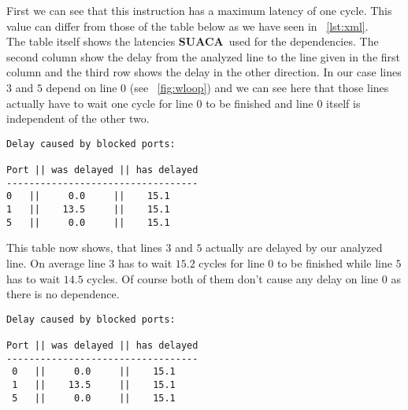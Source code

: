 \documentclass[a4paper,12pt,titlepage, twoside]{report}
\newcommand{\suaca}{\textbf{SUACA}}
\begin{document}
First we can see that this instruction has a maximum latency of one cycle. This value can differ from those of the table below as we have seen in ~\autoref{lst:xml}.\\
The table itself shows the latencies \suaca\ used for the dependencies. The second column show the delay from the analyzed line to the line given in the first column and the third row shows the delay in the other direction. In our case lines $3$ and $5$ depend on line $0$ (see ~\autoref{fig:wloop}) and we can see here that those lines actually have to wait one cycle for line $0$ to be finished and line $0$ itself is independent of the other two.\\

\begin{mdframed}[backgroundcolor=light-gray, roundcorner=10pt,leftmargin=1, rightmargin=1, innerleftmargin=15, innertopmargin=15,innerbottommargin=15, outerlinewidth=1, linecolor=light-gray]
\begin{center}
\begin{BVerbatim}[fontsize=\scriptsize]
Delay caused by blocked ports:

Port || was delayed || has delayed
----------------------------------
0   ||     0.0     ||    15.1
1   ||    13.5     ||    15.1
5   ||     0.0     ||    15.1
\end{BVerbatim}
\end{center}
\end{mdframed}

This table now shows, that lines $3$ and $5$ actually are delayed by our analyzed line. On average line $3$ has to wait $15.2$ cycles for line $0$ to be finished while line $5$ has to wait $14.5$ cycles. Of course both of them don't cause any delay on line $0$ as there is no dependence.\\

\begin{mdframed}[backgroundcolor=light-gray, roundcorner=10pt,leftmargin=1, rightmargin=1, innerleftmargin=15, innertopmargin=15,innerbottommargin=15, outerlinewidth=1, linecolor=light-gray]
\begin{center}
\begin{BVerbatim}[fontsize=\scriptsize]
Delay caused by blocked ports:

Port || was delayed || has delayed
----------------------------------
 0   ||     0.0     ||    15.1
 1   ||    13.5     ||    15.1
 5   ||     0.0     ||    15.1
\end{BVerbatim}
\end{center}
\end{mdframed}
\end{document}
